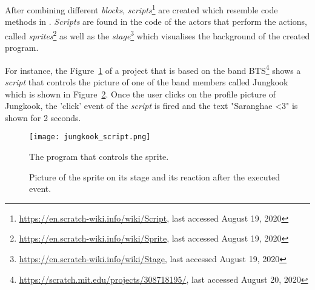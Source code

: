 After combining different \textit{blocks}, \textit{scripts}\footnote{\url{https://en.scratch-wiki.info/wiki/Script}, last accessed August 19, 2020} are created which resemble code methods in \java{}. \textit{Scripts} are found in the code of the actors that perform the actions, called \textit{sprites}\footnote{\url{https://en.scratch-wiki.info/wiki/Sprite}, last accessed August 19, 2020} as well as the \textit{stage}\footnote{\url{https://en.scratch-wiki.info/wiki/Stage}, last accessed August 19, 2020} which visualises the background of the created program. 

For instance, the Figure~\ref{fig:script} of a \scratch{} project that is based on the band BTS\footnote{\url{https://scratch.mit.edu/projects/308718195/}, last accessed August 20, 2020} shows a \textit{script} that controls the picture of one of the band members called Jungkook which is shown in Figure~\ref{fig:sprite}. Once the user clicks on the profile picture of Jungkook, the 'click' event of the \textit{script} is fired and the text "Saranghae <3" is shown for 2 seconds.

\begin{figure}[t]
    \centering
    \texttt{[image: jungkook\_script.png]}
    \caption[A \scratch{} script controlling the sprite]{\label{fig:script} The program that controls the sprite.}
\end{figure}

\begin{figure}[t]
    \centering
    \hfill
    \caption[A \scratch{} stage and sprite that respond to events]{\label{fig:sprite}Picture of the sprite on its stage and its reaction after the executed event.}
    \vspace{-1em}
\end{figure}

